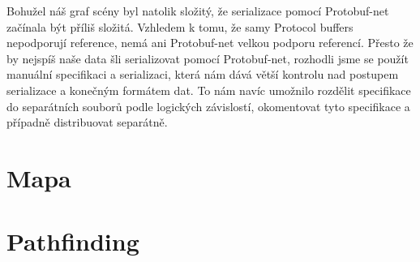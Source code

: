 Bohužel náš graf scény byl natolik složitý, že serializace pomocí Protobuf-net začínala být příliš složitá. Vzhledem k tomu, že samy Protocol buffers nepodporují reference, nemá ani Protobuf-net velkou podporu referencí. Přesto že by nejspíš naše data šli serializovat pomocí Protobuf-net, rozhodli jsme se použít manuální specifikaci a serializaci, která nám dává větší kontrolu nad postupem serializace a konečným formátem dat. To nám navíc umožnilo rozdělit specifikace do separátních souborů podle logických závislostí, okomentovat tyto specifikace a případně distribuovat separátně. 


\section{Mapa}

\section{Pathfinding}